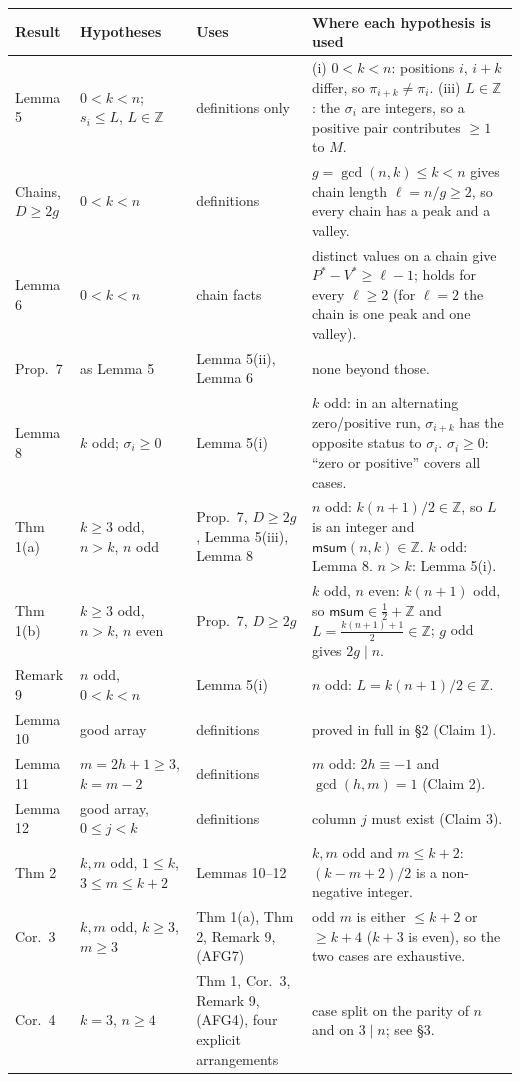 \documentclass[11pt]{amsart}
\theoremstyle{remark}
\newcommand{\msum}{\mathsf{msum}}
\newcommand{\Z}{\mathbb{Z}}
\begin{document}
\begin{longtable}{@{}>{\raggedright}p{2.3cm}>{\raggedright}p{3.3cm}>{\raggedright}p{3.6cm}>{\raggedright\arraybackslash}p{5.2cm}@{}}
\toprule
Result & Hypotheses & Uses & Where each hypothesis is used\\
\midrule
\endhead
Lemma 5 & $0<k<n$; $s_i\le L$, $L\in\Z$ & definitions only & (i) $0<k<n$: positions $i$, $i+k$ differ, so
$\pi_{i+k}\ne\pi_i$. (iii) $L\in\Z$: the $\sigma_i$ are integers, so a positive pair contributes $\ge1$ to $M$.\\
Chains, $D\ge2g$ & $0<k<n$ & definitions & $g=\gcd(n,k)\le k<n$ gives chain length $\ell=n/g\ge2$, so every chain
has a peak and a valley.\\
Lemma 6 & $0<k<n$ & chain facts & distinct values on a chain give $P^*-V^*\ge\ell-1$; holds for every $\ell\ge2$
(for $\ell=2$ the chain is one peak and one valley).\\
Prop.\ 7 & as Lemma 5 & Lemma 5(ii), Lemma 6 & none beyond those.\\
Lemma 8 & $k$ odd; $\sigma_i\ge0$ & Lemma 5(i) & $k$ odd: in an alternating zero/positive run, $\sigma_{i+k}$ has the
opposite status to $\sigma_i$. $\sigma_i\ge0$: ``zero or positive'' covers all cases.\\
Thm 1(a) & $k\ge3$ odd, $n>k$, $n$ odd & Prop.\ 7, $D\ge2g$, Lemma 5(iii), Lemma 8 & $n$ odd: $k(n+1)/2\in\Z$, so
$L$ is an integer and $\msum(n,k)\in\Z$. $k$ odd: Lemma 8. $n>k$: Lemma 5(i).\\
Thm 1(b) & $k\ge3$ odd, $n>k$, $n$ even & Prop.\ 7, $D\ge2g$ & $k$ odd, $n$ even: $k(n+1)$ odd, so
$\msum\in\frac12+\Z$ and $L=\frac{k(n+1)+1}2\in\Z$; $g$ odd gives $2g\mid n$.\\
Remark 9 & $n$ odd, $0<k<n$ & Lemma 5(i) & $n$ odd: $L=k(n+1)/2\in\Z$.\\
Lemma 10 & good array & definitions & proved in full in \S2 (Claim 1).\\
Lemma 11 & $m=2h+1\ge3$, $k=m-2$ & definitions & $m$ odd: $2h\equiv-1$ and $\gcd(h,m)=1$ (Claim 2).\\
Lemma 12 & good array, $0\le j<k$ & definitions & column $j$ must exist (Claim 3).\\
Thm 2 & $k,m$ odd, $1\le k$, $3\le m\le k+2$ & Lemmas 10--12 & $k,m$ odd and $m\le k+2$: $(k-m+2)/2$ is a
non-negative integer.\\
Cor.\ 3 & $k,m$ odd, $k\ge3$, $m\ge3$ & Thm 1(a), Thm 2, Remark 9, (AFG7) & odd $m$ is either $\le k+2$ or $\ge k+4$
($k+3$ is even), so the two cases are exhaustive.\\
Cor.\ 4 & $k=3$, $n\ge4$ & Thm 1, Cor.\ 3, Remark 9, (AFG4), four explicit arrangements & case split on the parity of
$n$ and on $3\mid n$; see \S3.\\
\bottomrule
\end{longtable}
\end{document}
